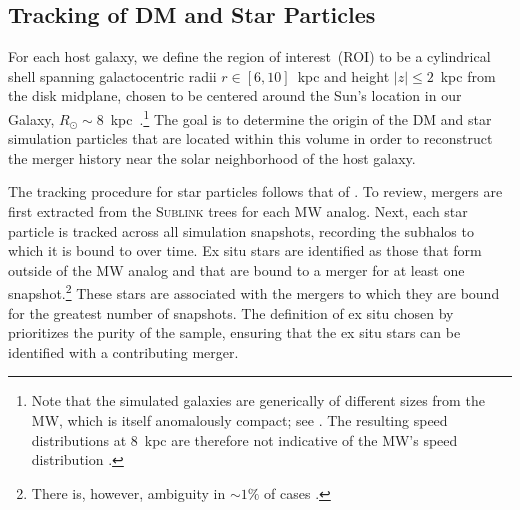 \documentclass[twocolumn,tighten,twocolappendix]{aastex701}
\newcommand{\sublink}{\textsc{Sublink}}
\newcommand{\osim}{\mathord{\sim}}
\begin{document}
\subsection{Tracking of DM and Star Particles}
\label{subsec:mergers}

For each host galaxy, we define the region of interest~(ROI) to be a cylindrical shell spanning galactocentric radii $r\in[6,10]$~kpc and height $|z|\leq 2$~kpc from the disk midplane, chosen to be centered around the Sun's location in our Galaxy, $R_\odot \sim 8$~kpc~\citep{2021A&A...647A..59G,2024A&A...692A.242G}.\footnote{Note that the simulated galaxies are generically of different sizes from the MW, which is itself anomalously compact; see \citet{2007ApJ...662..322H,2013ApJ...779..115B,2016ApJ...833..220L,2020MNRAS.498.4943B,2025MNRAS.540.3493T}. The resulting speed distributions at 8~kpc are therefore not indicative of the MW's speed distribution \citep{2025arXiv250507924F}.} The goal is to determine the origin of the DM and star simulation particles that are located within this volume in order to reconstruct the merger history near the solar neighborhood of the host galaxy.

The tracking procedure for star particles follows that of \citet{2025ApJ...983..119F}. To review, mergers are first extracted from the \sublink{} trees for each MW analog. Next, each star particle is tracked across all simulation snapshots, recording the subhalos to which it is bound to over time. Ex situ stars are identified as those that form outside of the MW analog and that are bound to a merger for at least one snapshot.\footnote{There is, however, ambiguity in $\osim1\%$ of cases \citep{2025ApJ...983..119F}.} These stars are associated with the mergers to which they are bound for the greatest number of snapshots. The definition of ex situ chosen by \citet{2025ApJ...983..119F} prioritizes the purity of the sample, ensuring that the ex situ stars can be identified with a contributing merger. 
\end{document}
